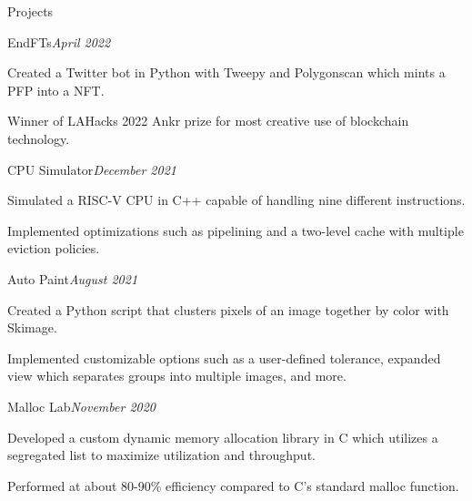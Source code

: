 \documentclass{resume} %
\begin{document}

\begin{rSection}{Projects}

    \begin{rSubsection}{EndFTs}{\em April 2022}{}{}
        \item Created a Twitter bot in Python with Tweepy and Polygonscan which mints a PFP into a NFT.
        \item Winner of LAHacks 2022 Ankr prize for most creative use of blockchain technology.
    \end{rSubsection}

    \begin{rSubsection}{CPU Simulator}{\em December 2021}{}{}
        \item Simulated a RISC-V CPU in C++ capable of handling nine different instructions.
        \item Implemented optimizations such as pipelining and a two-level cache with multiple eviction policies.
    \end{rSubsection}

    \begin{rSubsection}{Auto Paint}{\em August 2021}{}{}
        \item Created a Python script that clusters pixels of an image together by color with Skimage.
        \item Implemented customizable options such as a user-defined tolerance, expanded view which separates groups into multiple images, and more.
    \end{rSubsection}


    \begin{rSubsection}{Malloc Lab}{\em November 2020}{}{}
        \item Developed a custom dynamic memory allocation library in C which utilizes a segregated list to maximize utilization and throughput.
        \item Performed at about 80-90\% efficiency compared to C's standard malloc function.
    \end{rSubsection}


\end{rSection}
\end{document}

